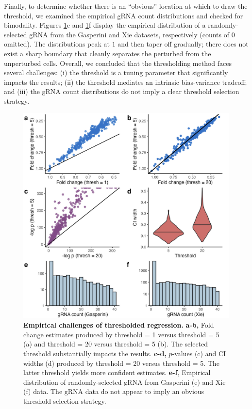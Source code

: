 \documentclass[12pt]{article}
\begin{document}
Finally, to determine whether there is an ``obvious'' location at which to draw the threshold, we examined the empirical gRNA count distributions and checked for bimodality. Figures \ref{thresholding_empirical}e and \ref{thresholding_empirical}f display the empirical distribution of a randomly-selected gRNA from the Gasperini and Xie datasets, respectively (counts of $0$ omitted). The distributions peak at $1$ and then taper off gradually; there does not exist a sharp boundary that cleanly separates the perturbed from the unperturbed cells. Overall, we concluded that the thresholding method faces several challenges: (i) the threshold is a tuning parameter that significantly impacts the results; (ii) the threshold mediates an intrinsic bias-variance tradeoff; and (iii) the gRNA count distributions do not imply a clear threshold selection strategy.

\begin{figure}[h!]
	\centering
	\includegraphics[width=1\linewidth]{../../figures/thresholding_empirical/plot}
	\caption{\textbf{Empirical challenges of thresholded regression.} \textbf{a-b,} Fold change estimates produced by threshold = 1 versus threshold = 5 (a) and threshold = 20 versus threshold = 5 (b). The selected threshold substantially impacts the results. \textbf{c-d,} $p$-values (c) and CI widths (d) produced by threshold = 20 versus threshold = 5. The latter threshold yields more confident estimates. \textbf{e-f}, Empirical distribution of randomly-selected gRNA from Gasperini (e) and Xie (f) data. The gRNA data do not appear to imply an obvious threshold selection strategy.}
	\label{thresholding_empirical}
\end{figure}
\newpage
\end{document}
